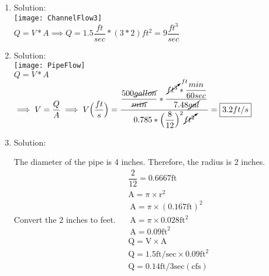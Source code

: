 \documentclass{article}
\begin{document}
\begin{enumerate}

\item Solution:\\
\texttt{[image: ChannelFlow3]}\\
$Q=V*A \implies Q = 1.5 \dfrac{ft}{sec}*(3*2)ft^2=\boxed{9\dfrac{ft^3}{sec}}$

\item Solution:\\
\vspace{0.5cm}
\texttt{[image: PipeFlow]}\\
$Q=V*A$\\
$\implies V=\dfrac{Q}{A} \implies V \Big(\dfrac{ft}{s}\Big)= \dfrac{\dfrac{500\cancel{gallon}}{\cancel{min}}*\dfrac{\cancelto{ft}{ft^3}*\dfrac{min}{60sec}}{7.48\cancel{gal}}}{0.785*\Big(\dfrac{8}{12}\Big)^2\cancelto{}{ft^2}}=\boxed{3.2ft/s}$

\item Solution:\\

\vspace{0.5cm}

The diameter of the pipe is 4 inches. Therefore, the radius is 2 inches. Convert the 2 inches to feet.
$
\begin{aligned}
&\dfrac{2}{12}=0.6667 \mathrm{ft} \\
&\mathrm{A}=\pi \times \mathrm{r}^{2} \\
&\mathrm{~A}=\pi \times(0.167 \mathrm{ft})^{2} \\
&\mathrm{~A}=\pi \times 0.028 \mathrm{ft}^{2} \\
&\mathrm{~A}=0.09 \mathrm{ft}^{2} \\
&\mathrm{Q}=\mathrm{V} \times \mathrm{A} \\
&\mathrm{Q}=1.5 \mathrm{ft} / \mathrm{sec} \times 0.09 \mathrm{ft}^{2} \\
&\mathrm{Q}=0.14 \mathrm{ft} / 3 \mathrm{sec}(\mathrm{cfs})
\end{aligned}
$



\vspace{1cm}
\end{enumerate}
\end{document}
